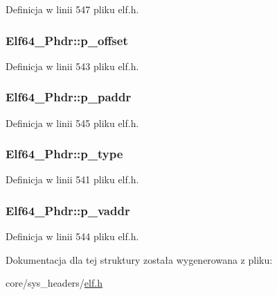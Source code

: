 Definicja w linii 547 pliku elf.\-h.

\hypertarget{struct_elf64___phdr_aa2d51fb4517ded0c74903f8d0c9abea7}{
\subsubsection[{p\-\_\-offset}]{ Elf64\-\_\-\-Phdr\-::p\-\_\-offset}}\label{struct_elf64___phdr_aa2d51fb4517ded0c74903f8d0c9abea7}


Definicja w linii 543 pliku elf.\-h.

\hypertarget{struct_elf64___phdr_a83f4adb032fc307f5af79bdee5ef692d}{
\subsubsection[{p\-\_\-paddr}]{ Elf64\-\_\-\-Phdr\-::p\-\_\-paddr}}\label{struct_elf64___phdr_a83f4adb032fc307f5af79bdee5ef692d}


Definicja w linii 545 pliku elf.\-h.

\hypertarget{struct_elf64___phdr_aee6ec430eaaf8b8faf82ae6397282cb3}{
\subsubsection[{p\-\_\-type}]{ Elf64\-\_\-\-Phdr\-::p\-\_\-type}}\label{struct_elf64___phdr_aee6ec430eaaf8b8faf82ae6397282cb3}


Definicja w linii 541 pliku elf.\-h.

\hypertarget{struct_elf64___phdr_a5c69879e1229b175020ff011af46fcb9}{
\subsubsection[{p\-\_\-vaddr}]{ Elf64\-\_\-\-Phdr\-::p\-\_\-vaddr}}\label{struct_elf64___phdr_a5c69879e1229b175020ff011af46fcb9}


Definicja w linii 544 pliku elf.\-h.



Dokumentacja dla tej struktury została wygenerowana z pliku\-:\begin{DoxyCompactItemize}
\item 
core/sys\-\_\-headers/\hyperlink{elf_8h}{elf.\-h}\end{DoxyCompactItemize}
